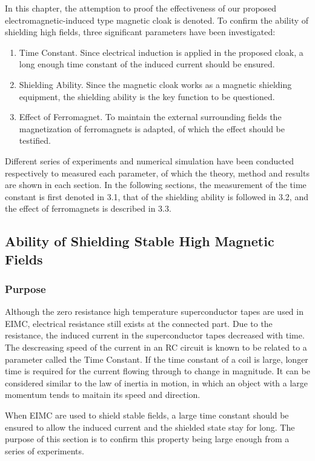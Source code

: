 In this chapter, the attemption to proof the effectiveness of our proposed electromagnetic-induced type magnetic cloak is denoted.
To confirm the ability of shielding high fields, three significant parameters have been investigated:
\begin{enumerate}
  \item Time Constant. Since electrical induction is applied in the proposed cloak,
  a long enough time constant of the induced current should be ensured.
  \item Shielding Ability. Since the magnetic cloak works as a magnetic shielding equipment,
  the shielding ability is the key function to be questioned.
  \item Effect of Ferromagnet. To maintain the external surrounding fields the magnetization of ferromagnets is adapted,
  of which the effect should be testified.
\end{enumerate}
Different series of experiments and numerical simulation have been conducted respectively to measured each parameter,
of which the theory, method and results are shown in each section.
In the following sections,
the measurement of the time constant is first denoted in 3.1,
that of the shielding ability is followed in 3.2,
and the effect of ferromagnets is described in 3.3.

\newpage
\subsection{Ability of Shielding Stable High Magnetic Fields}
\subsubsection{Purpose}
Although the zero resistance high temperature superconductor tapes are used in EIMC,
electrical resistance still exists at the connected part.
Due to the resistance, the induced current in the superconductor tapes decreased with time.
The descreasing speed of the current in an RC circuit is known to be related to a parameter called the Time Constant.
If the time constant of a coil is large, longer time is required for the current flowing through to change in magnitude.
It can be considered similar to the law of inertia in motion,
in which an object with a large momentum tends to maitain its speed and direction.

When EIMC are used to shield stable fields,
a large time constant should be ensured to allow the induced current and the shielded state stay for long.
The purpose of this section is to confirm this property being large enough from a series of experiments.

